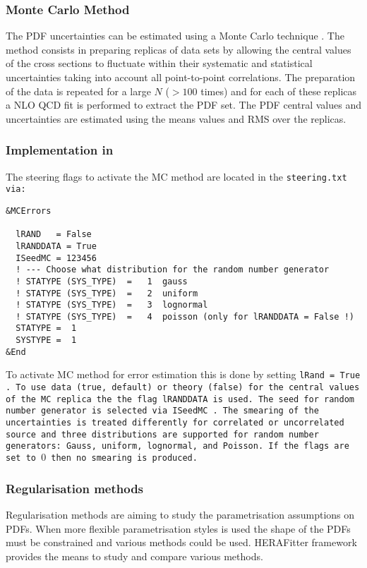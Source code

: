 \subsubsection{Monte Carlo Method}
\label{sec:ToyMC}

The PDF uncertainties can be estimated using a Monte Carlo technique \cite{Giele:1998gw, mcmethod2}.
The method consists in preparing replicas of data sets by allowing the central values of the cross sections to 
fluctuate within their systematic and statistical uncertainties taking into account all point-to-point correlations.
The preparation of the data is repeated for a large $N$ ($>100$ times) and for each of these replicas a NLO QCD fit is performed to 
extract the PDF set. The PDF central values and uncertainties are estimated using the means values and RMS 
over the replicas. 
\subsubsection{Implementation in \fitter\ }
The steering flags to activate the MC method are located in the \tt steering.txt \rm via:

\begin{verbatim}
&MCErrors

  lRAND   = False  
  lRANDDATA = True
  ISeedMC = 123456 
  ! --- Choose what distribution for the random number generator 
  ! STATYPE (SYS_TYPE)  =   1  gauss
  ! STATYPE (SYS_TYPE)  =   2  uniform
  ! STATYPE (SYS_TYPE)  =   3  lognormal
  ! STATYPE (SYS_TYPE)  =   4  poisson (only for lRANDDATA = False !)
  STATYPE =  1
  SYSTYPE =  1
&End
\end{verbatim}
To activate MC method for error estimation this is done by setting \tt lRand = True \rm.
To use data (true, default) or theory (false) for the central values of the MC replica
the the flag \tt lRANDDATA \rm is used. The seed for random number generator is selected 
via \tt ISeedMC \rm . The smearing of the uncertainties is treated differently for correlated 
or uncorrelated source and three distributions are supported for random number generators: Gauss, uniform, lognormal, and Poisson. If the flags are set to $0$ then no smearing is produced.




\subsubsection{Regularisation methods}

Regularisation methods are aiming to study the parametrisation assumptions on PDFs. When more flexible parametrisation styles is used the shape of the PDFs must be constrained and various methods could be used.
HERAFitter framework provides the means to study and compare various methods.

